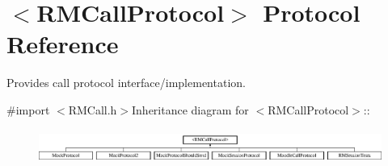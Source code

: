 \hypertarget{protocol_r_m_call_protocol-p}{
\section{$<$RMCallProtocol$>$ Protocol Reference}
\label{protocol_r_m_call_protocol-p}
}


Provides call protocol interface/implementation.  


{\ttfamily \#import $<$RMCall.h$>$}Inheritance diagram for $<$RMCallProtocol$>$::\begin{figure}[H]
\begin{center}
\leavevmode
\includegraphics[height=1.1245cm]{protocol_r_m_call_protocol-p}
\end{center}
\end{figure}
